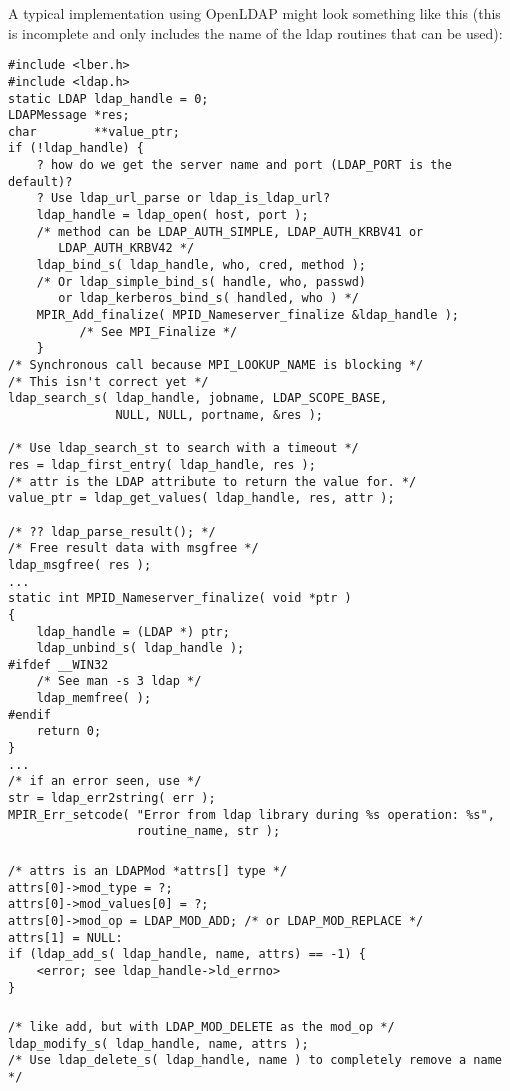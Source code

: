\documentclass{article}
\begin{document}
A typical implementation using OpenLDAP might look something like
this (this is incomplete and only includes the name of the ldap
routines that can be used):
\begin{verbatim}
#include <lber.h>
#include <ldap.h>
static LDAP ldap_handle = 0;
LDAPMessage *res;
char        **value_ptr;
if (!ldap_handle) {
    ? how do we get the server name and port (LDAP_PORT is the default)?
    ? Use ldap_url_parse or ldap_is_ldap_url?
    ldap_handle = ldap_open( host, port );
    /* method can be LDAP_AUTH_SIMPLE, LDAP_AUTH_KRBV41 or 
       LDAP_AUTH_KRBV42 */
    ldap_bind_s( ldap_handle, who, cred, method );
    /* Or ldap_simple_bind_s( handle, who, passwd) 
       or ldap_kerberos_bind_s( handled, who ) */
    MPIR_Add_finalize( MPID_Nameserver_finalize &ldap_handle );  
          /* See MPI_Finalize */
    }
/* Synchronous call because MPI_LOOKUP_NAME is blocking */
/* This isn't correct yet */
ldap_search_s( ldap_handle, jobname, LDAP_SCOPE_BASE, 
               NULL, NULL, portname, &res );

/* Use ldap_search_st to search with a timeout */
res = ldap_first_entry( ldap_handle, res );
/* attr is the LDAP attribute to return the value for. */
value_ptr = ldap_get_values( ldap_handle, res, attr );

/* ?? ldap_parse_result(); */
/* Free result data with msgfree */
ldap_msgfree( res );
...
static int MPID_Nameserver_finalize( void *ptr )
{
    ldap_handle = (LDAP *) ptr;
    ldap_unbind_s( ldap_handle );
#ifdef __WIN32
    /* See man -s 3 ldap */
    ldap_memfree( );
#endif
    return 0;
}
...
/* if an error seen, use */
str = ldap_err2string( err );
MPIR_Err_setcode( "Error from ldap library during %s operation: %s", 
                  routine_name, str );
\end{verbatim}

\subsubsection{}
\begin{verbatim}
/* attrs is an LDAPMod *attrs[] type */
attrs[0]->mod_type = ?;
attrs[0]->mod_values[0] = ?;
attrs[0]->mod_op = LDAP_MOD_ADD; /* or LDAP_MOD_REPLACE */
attrs[1] = NULL:
if (ldap_add_s( ldap_handle, name, attrs) == -1) {
    <error; see ldap_handle->ld_errno>
}
\end{verbatim}

\subsubsection{}
\begin{verbatim}
/* like add, but with LDAP_MOD_DELETE as the mod_op */
ldap_modify_s( ldap_handle, name, attrs );
/* Use ldap_delete_s( ldap_handle, name ) to completely remove a name */
\end{verbatim}
\end{document}
